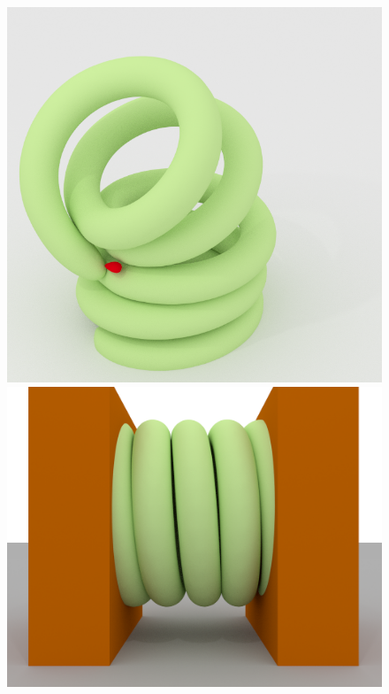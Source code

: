 \begin{figure}
{\includegraphics[height=.2\paperheight]{chapter_nonmanifoldlevelsets/images/coil_040.png}
\hfill
\includegraphics[height=.2\paperheight]{chapter_nonmanifoldlevelsets/images/compression_005.png}
}
\subfloat{
}
\end{figure}
